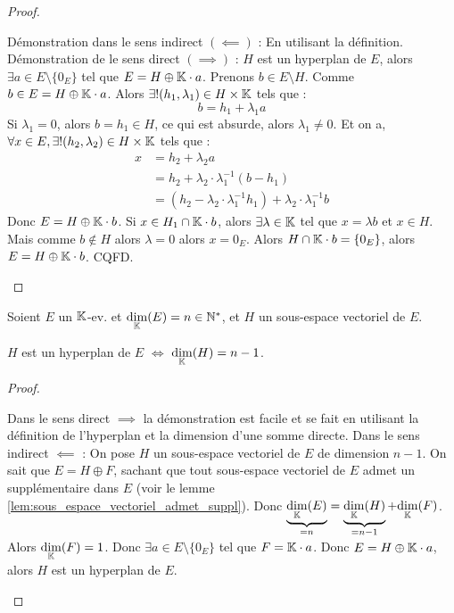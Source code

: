 \documentclass[12pt, a4paper]{report}
\begin{document}
\begin{proof}
    \begin{outline}
        \1 Démonstration dans le sens indirect $(\impliedby)$ : En utilisant la définition.
        \1 Démonstration de le sens direct $(\implies)$ :
        \2 $H$ est un hyperplan de $E$, alors $\exists a \in E\setminus\{0_E\}$ tel que $E = H \oplus \mathbb{K} \cdot a$.
        \2 Prenons $b \in E\setminus H$.
        \2 Comme $b \in E = H \oplus \mathbb{K} \cdot a$.
        \2 Alors $\exists ! (h_1,\lambda_1) \in H\times\mathbb{K}$ tels que : 
        $$b = h_1 + \lambda_1 a$$
        \2 Si $\lambda_1 = 0$, alors $b = h_1 \in H$, ce qui est absurde, alors $\lambda_1 \ne 0$.
        \2 Et on a, $\forall x \in E, \exists ! (h_2,\lambda_2) \in H\times\mathbb{K}$ tels que :
        \begin{align*}
            x &= h_2 + \lambda_2 a \\
            &= h_2 + \lambda_2 \cdot \lambda_1^{-1} (b - h_1) \\
            &= (h_2 - \lambda_2 \cdot \lambda_1^{-1} h_1) + \lambda_2 \cdot \lambda_1^{-1} b
        \end{align*}
        \2 Donc $E = H \oplus \mathbb{K} \cdot b$.
        \2 Si $x \in H_1 \cap \mathbb{K} \cdot b$, alors $\exists \lambda \in \mathbb{K}$ tel que $x = \lambda b$ et $x\in H$.
        \2 Mais comme $b \notin H$ alors $\lambda = 0$ alors $x = 0_E$.
        \2 Alors $H \cap \mathbb{K} \cdot b = \{0_E\}$, alors $E = H \oplus \mathbb{K} \cdot b$. CQFD.
    \end{outline}
\end{proof}

\begin{property}
    Soient $E$ un $\mathbb{K}$-ev. et $\underset{\mathbb{K}}\dim(E) = n \in \mathbb{N}^*$, et $H$ un sous-espace vectoriel de $E$.

    $H$ est un hyperplan de $E$ $\iff$ $\underset{\mathbb{K}}\dim(H) = n-1$.
\end{property}

\begin{proof}
    \begin{outline}
        \1 Dans le sens direct $\implies$ la démonstration est facile et se fait en utilisant la définition de l'hyperplan et la dimension d'une somme directe.
        \1 Dans le sens indirect $\impliedby$ :
        \2 On pose $H$ un sous-espace vectoriel de $E$ de dimension $n-1$.
        \2 On sait que $E = H \oplus F$, sachant que tout sous-espace vectoriel de $E$ admet un supplémentaire dans $E$ (voir le lemme \ref{lem:sous_espace_vectoriel_admet_suppl}).
        \2 Donc $\underbrace{\underset{\mathbb{K}}\dim(E)}_{=n} = \underbrace{\underset{\mathbb{K}}\dim(H)}_{=n-1} + \underset{\mathbb{K}}\dim(F)$.
        \2 Alors $\underset{\mathbb{K}}\dim(F) = 1$.
        \2 Donc $\exists a \in E\setminus\{0_E\}$ tel que $F = \mathbb{K} \cdot a$.
        \2 Donc $E = H \oplus \mathbb{K} \cdot a$, alors $H$ est un hyperplan de $E$.
    \end{outline}
\end{proof}
\end{document}
